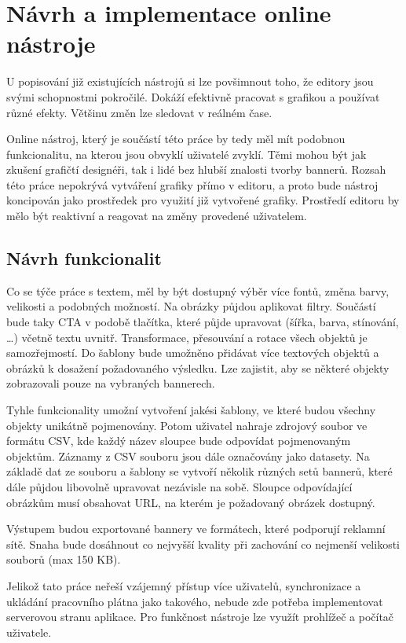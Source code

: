 \chapter{Návrh a implementace online nástroje}
\label{chap:design}
U popisování již existujících nástrojů si lze povšimnout toho, že editory jsou svými schopnostmi pokročilé.
Dokáží efektivně pracovat s grafikou a používat různé efekty. Většinu změn lze sledovat v reálném čase. 

Online nástroj, který je součástí této práce by tedy měl mít podobnou funkcionalitu, na kterou jsou obvyklí uživatelé zvyklí.
Těmi mohou být jak zkušení grafičtí designéři, tak i lidé bez hlubší znalosti tvorby bannerů.
Rozsah této práce nepokrývá vytváření grafiky přímo v editoru, a proto bude nástroj koncipován jako prostředek pro využití již vytvořené grafiky.
Prostředí editoru by mělo být reaktivní a reagovat na změny provedené uživatelem.

    \section{Návrh funkcionalit}
    Co se týče práce s textem, měl by být dostupný výběr více fontů, změna barvy, velikosti a podobných možností.
    Na obrázky půjdou aplikovat filtry. Součástí bude taky CTA v podobě tlačítka, které půjde upravovat (šířka, barva, stínování, \ldots) včetně textu uvnitř.
    Transformace, přesouvání a rotace všech objektů je samozřejmostí. Do šablony bude umožněno přidávat více textových objektů a obrázků k
    dosažení požadovaného výsledku. Lze zajistit, aby se některé objekty zobrazovali pouze na vybraných bannerech.

    Tyhle funkcionality umožní vytvoření jakési šablony, ve které budou všechny objekty unikátně pojmenovány.
    Potom uživatel nahraje zdrojový soubor ve formátu CSV, kde každý název sloupce bude odpovídat pojmenovaným objektům.
    Záznamy z CSV souboru jsou dále označovány jako datasety. Na základě dat ze souboru a šablony se vytvoří několik různých setů bannerů,
    které dále půjdou libovolně upravovat nezávisle na sobě. Sloupce odpovídající obrázkům musí obsahovat URL, na kterém je požadovaný obrázek dostupný.

    Výstupem budou exportované bannery ve formátech, které podporují reklamní sítě.
    Snaha bude dosáhnout co nejvyšší kvality při zachování co nejmenší velikosti souborů (max 150 KB). 

    Jelikož tato práce neřeší vzájemný přístup více uživatelů, synchronizace a ukládání pracovního plátna jako takového,
    nebude zde potřeba implementovat serverovou stranu aplikace. Pro funkčnost nástroje lze využít prohlížeč a počítač uživatele.

